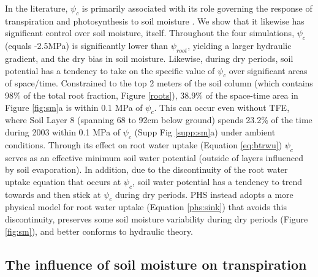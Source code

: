 \documentclass[draft,linenumbers]{agujournal}
\begin{document}
    In the literature, $\psi_c$ is primarily associated with its role governing the response of transpiration and photosynthesis to soil moisture \citep{powell2013,bonan2014,rogers2017}.
    We show that it likewise has significant control over soil moisture, itself. 
    Throughout the four simulations, $\psi_c$ (equals -2.5MPa) is significantly lower than $\psi_{root}$, yielding a larger hydraulic gradient, and the dry bias in soil moisture.
    Likewise, during dry periods, soil potential has a tendency to take on the specific value of $\psi_c$ over significant areas of space/time.
    Constrained to the top 2 meters of the soil column (which contains 98\% of the total root fraction, Figure \ref{roots}), 38.9\% of the space-time area in Figure \ref{fig:sm}a is within 0.1 MPa of $\psi_c$.
    This can occur even without TFE, where Soil Layer 8 (spanning 68 to 92cm below ground) spends 23.2\% of the time during 2003 within 0.1 MPa of $\psi_c$ (Supp Fig \ref{supp:sm}a) under ambient conditions.
    Through its effect on root water uptake (Equation \ref{eq:btrwu}) $\psi_c$ serves as an effective minimum soil water potential (outside of layers influenced by soil evaporation).
    In addition, due to the discontinuity of the root water uptake equation that occurs at $\psi_c$, soil water potential has a tendency to trend towards and then stick at $\psi_c$ during dry periods.
    PHS instead adopts a more physical model for root water uptake (Equation \ref{phs:sink}) that avoids this discontinuity, preserves some soil moisture variability during dry periods (Figure \ref{fig:sm}), and better conforms to hydraulic theory.
    
\subsection{The influence of soil moisture on transpiration}
    
\end{document}
